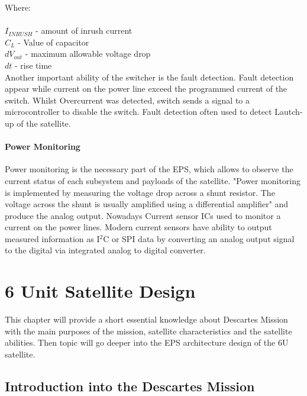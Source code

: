  Where:\\ \\
 $I_{INRUSH}$ - amount of inrush current\\
 $C_{L}$ - Value of capacitor \\
 $dV_{out}$ - maximum allowable voltage drop\\
 $dt$ - rise time\\

Another important ability of the switcher is the fault detection. Fault detection appear while current on the power line exceed the programmed current of the switch. Whilst Overcurrent was detected, switch sends a signal to a microcontroller to disable the switch. Fault detection often used to detect Lautch-up of the satellite.\\

\subsubsection{Power Monitoring}

Power monitoring is the necessary part of the EPS, which allows to observe the current status of each subsystem and payloads of the satellite. \cite{22} "Power monitoring is implemented by measuring the 
voltage drop across a shunt resistor.  The voltage across the shunt  is  usually  amplified  using  a  differential amplifier" and produce the analog output. Nowadays Current sensor ICs used to monitor a current on the power lines. Modern current sensors have ability to output measured information as I$^{2}$C or SPI data by converting an analog output signal to the digital via integrated analog to digital converter. 

\newpage   
\chapter{6 Unit Satellite Design \label{chapter3}}
This chapter will provide a short essential knowledge about Descartes Mission with the main purposes of the mission, satellite characteristics and the satellite  abilities. Then topic will go deeper into the EPS architecture design of the 6U satellite. \\
\section{Introduction into the Descartes Mission}

